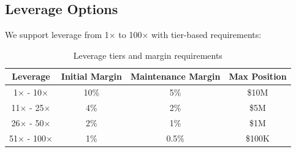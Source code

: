 \subsection{Leverage Options}

We support leverage from 1$\times$ to 100$\times$ with tier-based requirements:

\begin{table}[h]
\centering
\begin{tabular}{|c|c|c|c|}
\hline
\textbf{Leverage} & \textbf{Initial Margin} & \textbf{Maintenance Margin} & \textbf{Max Position} \\
\hline
1$\times$ - 10$\times$ & 10\% & 5\% & \$10M \\
11$\times$ - 25$\times$ & 4\% & 2\% & \$5M \\
26$\times$ - 50$\times$ & 2\% & 1\% & \$1M \\
51$\times$ - 100$\times$ & 1\% & 0.5\% & \$100K \\
\hline
\end{tabular}
\caption{Leverage tiers and margin requirements}
\end{table}

